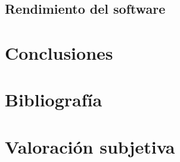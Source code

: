 \documentclass[11pt, titlepage,a4paper]{article}
\begin{document}
\subsection{Rendimiento del software}

\section{Conclusiones}

\section{Bibliografía}
%

\section{Valoración subjetiva}

\end{document}
